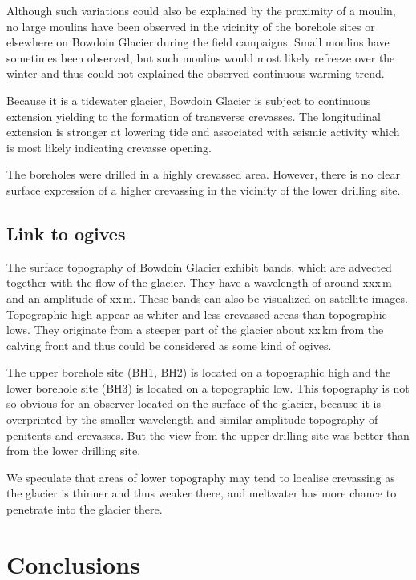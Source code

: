 \documentclass[utf8]{article}
\begin{document}
    Although such variations could also be explained by the proximity of a
    moulin, no large moulins have been observed in the vicinity of the borehole
    sites or elsewhere on Bowdoin Glacier during the field campaigns. Small
    moulins have sometimes been observed, but such moulins would most likely
    refreeze over the winter and thus could not explained the observed
    continuous warming trend.

    Because it is a tidewater glacier, Bowdoin Glacier is subject to continuous
    extension yielding to the formation of transverse crevasses. The
    longitudinal extension is stronger at lowering tide and associated with
    seismic activity which is most likely indicating crevasse opening.

    The boreholes were drilled in a highly crevassed area. However, there is
    no clear surface expression of a higher crevassing in the vicinity of the
    lower drilling site.

\subsection{Link to ogives}

    The surface topography of Bowdoin Glacier exhibit bands, which are advected
    together with the flow of the glacier. They have a wavelength of around
    xxx\,m and an amplitude of xx\,m. These bands can also be visualized on
    satellite images. Topographic high appear as whiter and less crevassed
    areas than topographic lows. They originate from a steeper part of the
    glacier about xx\,km from the calving front and thus could be considered as
    some kind of ogives.

    The upper borehole site (BH1, BH2) is located on a topographic high and the
    lower borehole site (BH3) is located on a topographic low. This topography
    is not so obvious for an observer located on the surface of the glacier,
    because it is overprinted by the smaller-wavelength and similar-amplitude
    topography of penitents and crevasses. But the view from the upper drilling
    site was better than from the lower drilling site.

    We speculate that areas of lower topography may tend to localise crevassing
    as the glacier is thinner and thus weaker there, and meltwater has more
    chance to penetrate into the glacier there.

\section{Conclusions}
\end{document}
